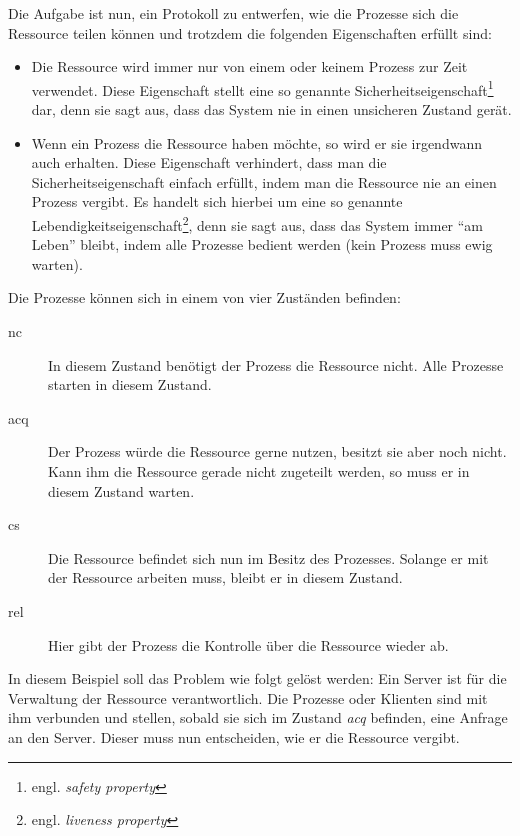 Die Aufgabe ist nun, ein Protokoll zu entwerfen, wie die Prozesse sich die Ressource teilen können und trotzdem die folgenden Eigenschaften erfüllt sind:
\begin{itemize}
\item Die Ressource wird immer nur von einem oder keinem Prozess zur Zeit verwendet.
  Diese Eigenschaft stellt eine so genannte Sicherheitseigenschaft\footnote{engl. \emph{safety property}} dar, denn sie sagt aus, dass das System nie in einen unsicheren Zustand gerät.
\item Wenn ein Prozess die Ressource haben möchte, so wird er sie irgendwann auch erhalten.
  Diese Eigenschaft verhindert, dass man die Sicherheitseigenschaft einfach erfüllt, indem man die Ressource nie an einen Prozess vergibt.
  Es handelt sich hierbei um eine so genannte Lebendigkeitseigenschaft\footnote{engl. \emph{liveness property}}, denn sie sagt aus, dass das System immer "`am Leben"' bleibt, indem alle Prozesse bedient werden (kein Prozess muss ewig warten).
\end{itemize}
Die Prozesse können sich in einem von vier Zuständen befinden:
\begin{description}
\item[nc] In diesem Zustand benötigt der Prozess die Ressource nicht.
  Alle Prozesse starten in diesem Zustand.
\item[acq] Der Prozess würde die Ressource gerne nutzen, besitzt sie aber noch nicht.
  Kann ihm die Ressource gerade nicht zugeteilt werden, so muss er in diesem Zustand warten.
\item[cs] Die Ressource befindet sich nun im Besitz des Prozesses.
  Solange er mit der Ressource arbeiten muss, bleibt er in diesem Zustand.
\item[rel] Hier gibt der Prozess die Kontrolle über die Ressource wieder ab.
\end{description}
In diesem Beispiel soll das Problem wie folgt gelöst werden:
Ein Server ist für die Verwaltung der Ressource verantwortlich.
Die Prozesse oder Klienten sind mit ihm verbunden und stellen, sobald sie sich im Zustand \emph{acq} befinden, eine Anfrage an den Server.
Dieser muss nun entscheiden, wie er die Ressource vergibt.


